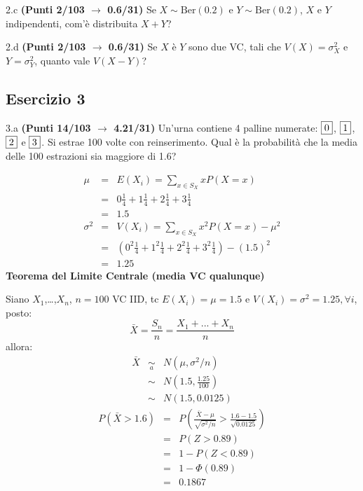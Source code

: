 \documentclass[
  11pt,
]{book}
\theoremstyle{mytheoremstyle}
\theoremstyle{mydefstyle}
\newenvironment{sol}
  {
  \begin{tcolorbox}[enhanced,breakable,arc=0.1mm,boxrule=1pt,colback=white,colframe=iblue,
  title=\bf \fontfamily{lmss}\selectfont \hspace{.5 cm} Soluzione,drop fuzzy shadow]

}{
\end{tcolorbox}
  }
\begin{document}
2.c \textbf{(Punti 2/103 \(\rightarrow\) 0.6/31)} Se \(X\sim\text{Ber}(0.2)\) e \(Y\sim\text{Ber}(0.2)\), \(X\) e \(Y\) indipendenti, com'è distribuita \(X+Y\)?

2.d \textbf{(Punti 2/103 \(\rightarrow\) 0.6/31)} Se \(X\) è \(Y\) sono due VC, tali che \(V(X)=\sigma_X^2\) e \(Y=\sigma_Y^2\), quanto vale \(V(X-Y)\)?

\subsection{Esercizio 3}\label{esercizio-3-22}

3.a \textbf{(Punti 14/103 \(\rightarrow\) 4.21/31)} Un'urna contiene 4 palline numerate: \(\fbox{0}\), \(\fbox{1}\), \(\fbox{2}\) e \(\fbox{3}\). Si estrae 100 volte con reinserimento. Qual è la probabilità che la media delle 100 estrazioni sia maggiore di 1.6?

\begin{sol}
\begin{eqnarray*} \mu &=& E(X_i) = \sum_{x\in S_X}x P(X=x)\\ 
 &=&  0  \frac { 1 }{ 4 }+ 1  \frac { 1 }{ 4 }+ 2  \frac { 1 }{ 4 }+ 3  \frac { 1 }{ 4 } \\ 
            &=& 1.5 \\ 
 \sigma^2 &=& V(X_i) = \sum_{x\in S_X}x^2 P(X=x)-\mu^2\\ 
 &=&\left(  0  ^2\frac { 1 }{ 4 }+ 1  ^2\frac { 1 }{ 4 }+ 2  ^2\frac { 1 }{ 4 }+ 3  ^2\frac { 1 }{ 4 } \right)-( 1.5 )^2\\ 
            &=& 1.25 
\end{eqnarray*}
\textbf{Teorema del Limite Centrale (media VC qualunque)}

Siano \(X_1\),\ldots,\(X_n\), \(n=100\) VC IID, tc \(E(X_i)=\mu=1.5\) e \(V(X_i)=\sigma^2=1.25,\forall i\), posto:
\[
      \bar X=\frac{S_n}n =\frac{X_1 + ... + X_n}n
      \]
allora:\begin{eqnarray*}
  \bar X & \mathop{\sim}\limits_{a}& N(\mu,\sigma^2/n) \\
     &\sim & N\left(1.5,\frac{1.25}{100}\right) \\
     &\sim & N(1.5,0.0125)
  \end{eqnarray*}\begin{eqnarray*}
      P( \bar X   >   1.6 ) 
        &=& P\left(  \frac { \bar X  -  \mu }{ \sqrt{\sigma^2/n} }  >  \frac { 1.6  -  1.5 }{\sqrt{ 0.0125 }} \right)  \\
                 &=& P\left(  Z   >   0.89 \right) \\    &=& 1-P(Z< 0.89 )\\ 
                 &=&  1-\Phi( 0.89 ) \\ &=&  0.1867 
      \end{eqnarray*}

\end{sol}
\end{document}

